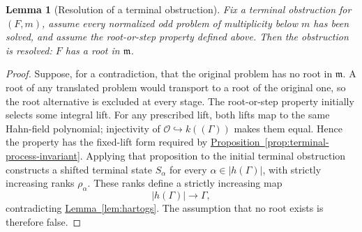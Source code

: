 \documentclass[11pt]{article}
\newcommand{\Ocal}{\mathcal O}
\newcommand{\namedref}[2]{\hyperref[#2]{#1~\ref*{#2}}}
\theoremstyle{proofnote}
\newtheorem{lemma}[theorem]{Lemma}
\begin{document}
\begin{lemma}[Resolution of a terminal obstruction]
\label{lem:terminal-prefix-resolution}
  Fix a terminal obstruction for \((F,m)\), assume every normalized odd
  problem of multiplicity below \(m\) has been solved, and assume the
  root-or-step property defined above.  Then the obstruction is resolved:
  \(F\) has a root in \(\mathfrak m\).
\end{lemma}
\begin{proof}
  Suppose, for a contradiction, that the original problem has no root in
  \(\mathfrak m\).  A root of any translated problem would transport to a
  root of the original one, so the root alternative is excluded at every
  stage.  The root-or-step property initially selects some integral lift.
  For any prescribed lift, both lifts map to the same Hahn-field polynomial;
  injectivity of \(\Ocal\hookrightarrow k((\Gamma))\) makes them equal.
  Hence the property has the fixed-lift form required by
  \namedref{Proposition}{prop:terminal-process-invariant}.  Applying that
  proposition to the initial terminal obstruction constructs a shifted terminal state
  \(S_\alpha\) for every \(\alpha\in|h(\Gamma)|\), with strictly increasing
  ranks \(\rho_\alpha\).  These ranks define a strictly increasing map
  \[
    |h(\Gamma)|\longrightarrow\Gamma,
  \]
  contradicting \namedref{Lemma}{lem:hartogs}.  The assumption that no root
  exists is therefore false.
\end{proof}
\end{document}
